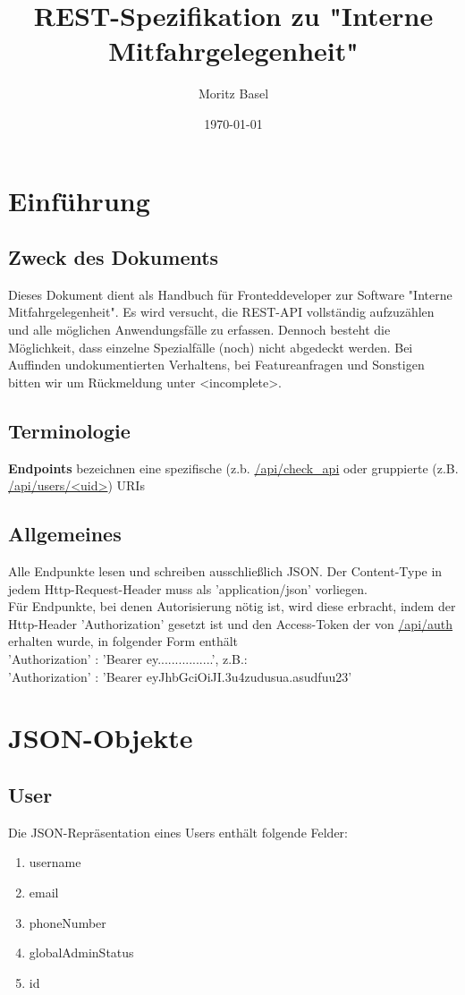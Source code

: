 \documentclass[11pt,a4paper]{article}
\author{Moritz Basel}
\title{REST-Spezifikation zu "Interne Mitfahrgelegenheit"}
\date{\today{}}
\begin{document}
\normalfont
\maketitle{}
\section{Einführung}
\subsection{Zweck des Dokuments}
Dieses Dokument dient als Handbuch für Fronteddeveloper zur Software "Interne Mitfahrgelegenheit". Es wird versucht, die REST-API vollständig aufzuzählen und alle möglichen Anwendungsfälle zu erfassen.
Dennoch besteht die Möglichkeit, dass einzelne Spezialfälle (noch) nicht abgedeckt werden. Bei Auffinden undokumentierten Verhaltens, bei Featureanfragen und Sonstigen bitten wir um Rückmeldung unter <incomplete>.
\subsection{Terminologie}
\textbf{Endpoints} bezeichnen eine spezifische (z.b. \url{/api/check_api} oder gruppierte (z.B. \url{/api/users/<uid>}) URIs
\subsection{Allgemeines}
Alle Endpunkte lesen und schreiben ausschließlich JSON. Der Content-Type in jedem Http-Request-Header muss als 'application/json' vorliegen.\\
Für Endpunkte, bei denen Autorisierung nötig ist, wird diese erbracht, indem der Http-Header 'Authorization' gesetzt ist und den Access-Token der von \url{/api/auth} erhalten wurde, in folgender Form enthält\\
'Authorization' : 'Bearer ey................', z.B.:\\
'Authorization' : 'Bearer eyJhbGciOiJI.3u4zudusua.asudfuu23'
\tableofcontents{}
\section{JSON-Objekte}
\subsection{User}
Die JSON-Repräsentation eines Users enthält folgende Felder:
\begin{enumerate}
\item username
\item email
\item phoneNumber
\item globalAdminStatus
\item id
\end{enumerate}
\end{document}
